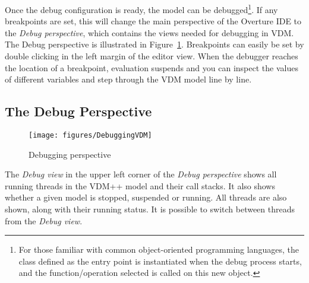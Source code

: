 %
Once the debug configuration is ready, the model can be debugged\footnote{For those familiar with common object-oriented programming languages, the class defined as the entry point is instantiated when the debug process starts, and the function/operation selected is called on this new object.}. If any breakpoints are set, this will change the main perspective of the Overture IDE to the \emph{Debug perspective}, which contains the views needed for debugging in VDM. The Debug perspective is illustrated in Figure~\ref{fig:DebuggingVDM}. Breakpoints can easily be set by double clicking in the left margin of the editor view. When the debugger reaches the location of a breakpoint, evaluation suspends and you can inspect the values of different variables and step through the VDM model line by line.
%
\subsection{The Debug Perspective}
%
\begin{figure}[htp]
\begin{center}
  \texttt{[image: figures/DebuggingVDM]}
  \caption[Debugging perspective]{Debugging perspective}
  \label{fig:DebuggingVDM}
\end{center}
\end{figure}
%
The \emph{Debug view} in the upper left corner of the \emph{Debug perspective} shows all running threads in the VDM++ model and their call stacks. It also shows whether a given model is stopped, suspended or running. All threads are also shown, along with their running
status. It is possible to switch between threads from the \emph{Debug view}.

